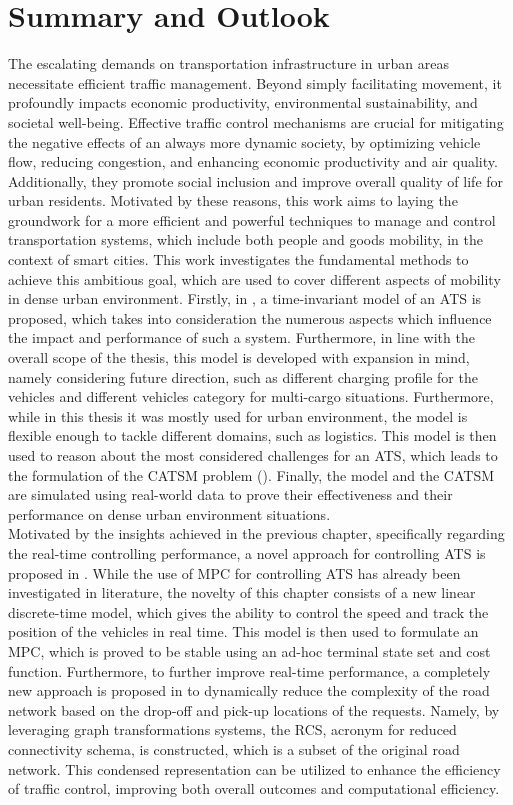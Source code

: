 \chapter{Summary and Outlook}\label{ch:summary}
The escalating demands on transportation infrastructure in urban areas necessitate efficient traffic management. Beyond simply facilitating movement, it profoundly impacts economic productivity, environmental sustainability, and societal well-being. Effective traffic control mechanisms are crucial for mitigating the negative effects of an always more dynamic society, by optimizing vehicle flow, reducing congestion, and enhancing economic productivity and air quality. Additionally, they promote social inclusion and improve overall quality of life for urban residents. Motivated by these reasons, this work aims to laying the groundwork for a more efficient and powerful techniques to manage and control transportation systems, which include both people and goods mobility, in the context of smart cities. This work investigates the fundamental methods to achieve this ambitious goal, which are used to cover different aspects of mobility in dense urban environment. Firstly, in , a time-invariant model of an ATS is proposed, which takes into consideration the numerous aspects which influence the impact and performance of such a system. Furthermore, in line with the overall scope of the thesis, this model is developed with expansion in mind, namely considering future direction, such as different charging profile for the vehicles and different vehicles category for multi-cargo situations. Furthermore, while in this thesis it was mostly used for urban environment, the model is flexible enough to tackle different domains, such as logistics. This model is then used to reason about the most considered challenges for an ATS, which leads to the formulation of the CATSM problem (). Finally, the model and the CATSM are simulated using real-world data to prove their effectiveness and their performance on dense urban environment situations. \\
Motivated by the insights achieved in the previous chapter, specifically regarding the real-time controlling performance, a novel approach for controlling ATS is proposed in . While the use of MPC for controlling ATS has already been investigated in literature, the novelty of this chapter consists of a new linear discrete-time model, which gives the ability to control the speed and track the position of the vehicles in real time. This model is then used to formulate an MPC, which is proved to be stable using an ad-hoc terminal state set and cost function. Furthermore, to further improve real-time performance, a completely new approach is proposed in  to dynamically reduce the complexity of the road network based on the drop-off and pick-up locations of the requests. Namely, by leveraging graph transformations systems, the RCS, acronym for reduced connectivity schema, is constructed, which is a subset of the original road network. This condensed representation can be utilized to enhance the efficiency of traffic control, improving both overall outcomes and computational efficiency.\\
